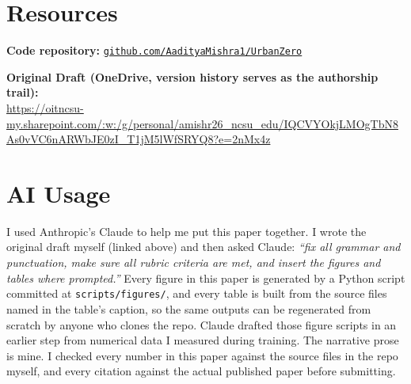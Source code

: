 \documentclass[conference]{IEEEtran}
\begin{document}
\section*{Resources}

\noindent
\textbf{Code repository:}
\href{https://github.com/AadityaMishra1/UrbanZero}%
{\nolinkurl{github.com/AadityaMishra1/UrbanZero}}

\smallskip
\noindent
\textbf{Original Draft (OneDrive, version history serves as the
authorship trail):} \\
\url{https://oitncsu-my.sharepoint.com/:w:/g/personal/amishr26_ncsu_edu/IQCVYOkjLMOgTbN8As0vVC6nARWbJE0zI_T1jM5lWfSRYQ8?e=2nMx4z}

\section*{AI Usage}

I used Anthropic's Claude to help me put this paper together. I wrote the original draft myself (linked above) and
then asked Claude: \emph{``fix all grammar and punctuation, make
sure all rubric criteria are met, and insert the figures and
tables where prompted.''} Every figure in this paper is generated
by a Python script committed at \texttt{scripts/figures/}, and
every table is built from the source files named in the table's
caption, so the same outputs can be regenerated from scratch by
anyone who clones the repo. Claude drafted those figure scripts
in an earlier step from numerical data I measured during training.
The narrative prose is mine. I checked every number in this paper
against the source files in the repo myself, and every citation
against the actual published paper before submitting.
\end{document}
